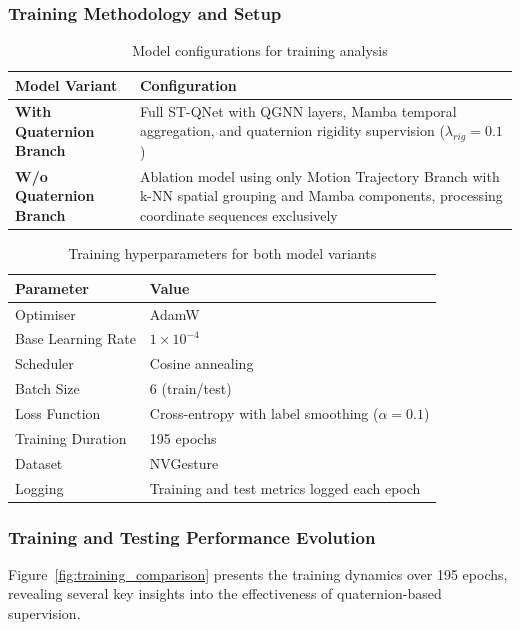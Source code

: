 \documentclass[journal]{IEEEtran}
\theoremstyle{plain}
\begin{document}
\subsubsection{Training Methodology and Setup}
\begin{table}[!ht]
\centering
\caption{Model configurations for training analysis}
\label{tab:finger}
\small
\begin{tabular}{@{}lp{4.5cm}@{}}
\hline
\textbf{Model Variant} & \textbf{Configuration} \\
\hline
\textbf{With Quaternion Branch} & Full ST-QNet with QGNN layers, Mamba temporal aggregation, and quaternion rigidity supervision ($\lambda_{rig} = 0.1$) \\
\textbf{W/o Quaternion Branch} & Ablation model using only Motion Trajectory Branch with k-NN spatial grouping and Mamba components, processing coordinate sequences exclusively \\
\hline
\end{tabular}
\end{table}

\begin{table}[!ht]
\centering
\caption{Training hyperparameters for both model variants}
\label{tab:training_hyperparameters}
\small
\begin{tabular}{@{}ll@{}}
\hline
\textbf{Parameter} & \textbf{Value} \\
\hline
Optimiser & AdamW \\
Base Learning Rate & $1 \times 10^{-4}$ \\
Scheduler & Cosine annealing \\
Batch Size & 6 (train/test) \\
Loss Function & Cross-entropy with label smoothing ($\alpha = 0.1$) \\
Training Duration & 195 epochs \\
Dataset & NVGesture \\
Logging & Training and test metrics logged each epoch \\
\hline
\end{tabular}
\end{table}

\subsubsection{Training and Testing Performance Evolution}
Figure~\ref{fig:training_comparison} presents the training dynamics over 195 epochs, revealing several key insights into the effectiveness of quaternion-based supervision.
\end{document}
